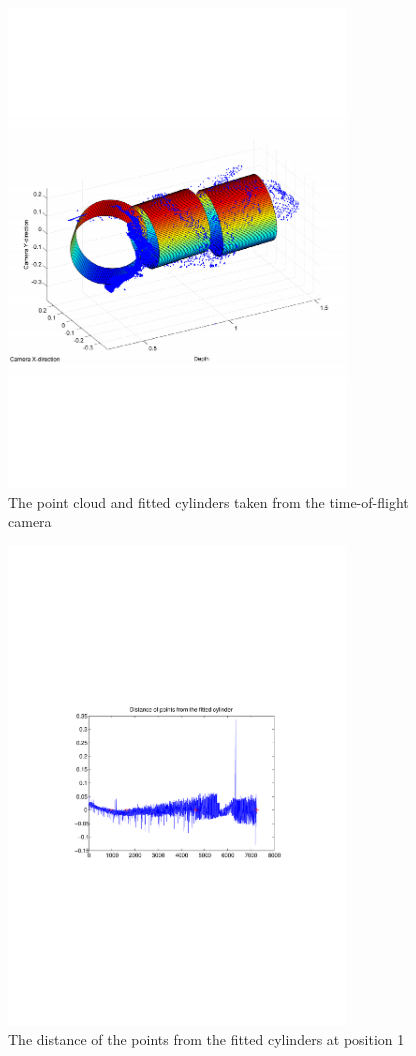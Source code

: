 \begin{figure}[htbp]
    \centering
    \includegraphics[width=0.8\textwidth]{pics/longpipe-tof-3d}
    \caption{The point cloud and fitted cylinders taken from the time-of-flight camera}
    \label{chap7:fig-longpipe-tof-3d}
\end{figure}
\begin{figure}[htbp]
    \centering
    \includegraphics[width=0.8\textwidth]{pics/longpipe-tof-dist}
    \caption{The distance of the points from the fitted cylinders at position 1}
    \label{chap7:fig-longpipe-tof-dist}
\end{figure}
